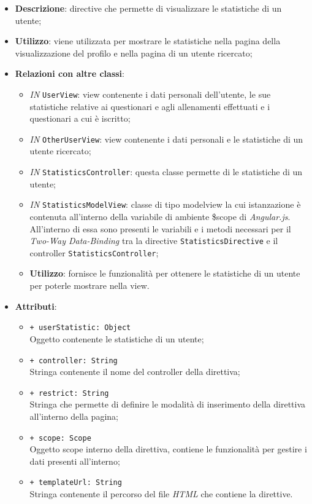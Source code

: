 \begin{itemize}
	\item \textbf{Descrizione}: directive che permette di visualizzare le statistiche di un utente;
	\item \textbf{Utilizzo}: viene utilizzata per mostrare le statistiche nella pagina della visualizzazione del profilo e nella pagina di un utente ricercato;
	\item \textbf{Relazioni con altre classi}:
	\begin{itemize}
		\item \textit{IN} \texttt{UserView}: view contenente i dati personali dell'utente, le sue statistiche relative ai questionari e agli allenamenti effettuati e i questionari a cui è iscritto;
		\item \textit{IN} \texttt{OtherUserView}: view contenente i dati personali e le statistiche di un utente ricercato;
		\item \textit{IN} \texttt{StatisticsController}: questa classe permette di le statistiche di un utente;
		\item \textit{IN} \texttt{StatisticsModelView}: classe di tipo modelview la cui istanzazione è contenuta all'interno della variabile di ambiente \$scope di \textit{Angular.js}. All'interno di essa sono presenti le variabili e i metodi necessari per il \textit{Two-Way Data-Binding} tra la directive \texttt{StatisticsDirective} e il controller \texttt{StatisticsController};
		\item \textbf{Utilizzo}: fornisce le funzionalità per ottenere le statistiche di un utente per poterle mostrare nella view. 
	\end{itemize}
	\item \textbf{Attributi}:
	\begin{itemize}
		\item \texttt{+ userStatistic: Object} \\ Oggetto contenente le statistiche di un utente;
		\item \texttt{+ controller: String} \\ Stringa contenente il nome del controller della direttiva;
		\item \texttt{+ restrict: String} \\ Stringa che permette di definire le modalità di inserimento della direttiva all'interno della pagina;
		\item \texttt{+ scope: Scope} \\ Oggetto scope interno della direttiva, contiene le funzionalità per gestire i dati presenti all'interno;
		\item \texttt{+ templateUrl: String} \\ Stringa contenente il percorso del file \textit{HTML} che contiene la direttive.
	\end{itemize}
\end{itemize}

